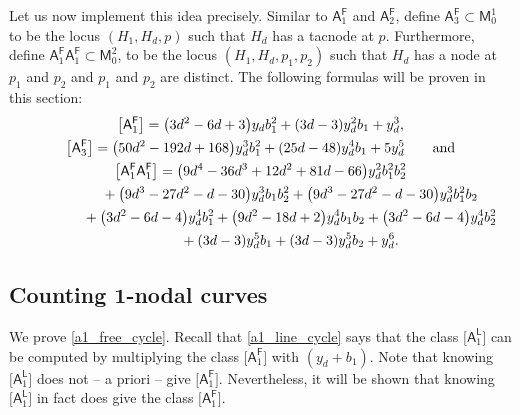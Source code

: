 \documentclass[pdftex]{sigma}
\numberwithin{equation}{section}
\begin{document}
Let us now implement this idea precisely.
Similar to $\mathsf{A}_1^{\mathsf{F}}$ and $\mathsf{A}_2^{\mathsf{F}}$, define
$\mathsf{A}_3^{\mathsf{F}} \subset \mathsf{M}^1_0$ to be the locus $(H_1, H_d, p)$
such that $H_d$ has a tacnode at $p$.
Furthermore, define $\mathsf{A}_1^{\mathsf{F}} \mathsf{A}_1^{\mathsf{F}} \subset \mathsf{M}^2_0$, to be
the locus $(H_1, H_d, p_1, p_2)$
such that $H_d$ has a node at $p_1$ and $p_2$ and $p_1$ and $p_2$ are distinct.
The following formulas will be proven in this section:
\begin{gather}
\bigl[\mathsf{A}_1^{\mathsf{F}}\bigr]  = \bigl(3d^2-6d+3\bigr) y_d b_1^2 + (3d-3)y_d^2 b_1 + y_d^3, \label{a1_free_cycle} \\
\bigl[\mathsf{A}_3^{\mathsf{F}}\bigr]  = \bigl(50d^2-192d+168\bigr) y_d^3 b_1^2 + (25d-48)y_d^4 b_1 + 5 y_d^5 \qquad \textnormal{and}
\label{A3F_cycle}\\
\bigl[\mathsf{A}_1^{\mathsf{F}} \mathsf{A}_1^{\mathsf{F}}\bigr]  = \bigl(9d^4-36d^3+12d^2+81d-66\bigr)y_d^2 b_1^2 b_2^2 \nonumber \\
\phantom{\bigl[\mathsf{A}_1^{\mathsf{F}} \mathsf{A}_1^{\mathsf{F}}\bigr]  = }{} + \bigl(9d^3-27d^2-d-30\bigr)y_d^3 b_1 b_2^2
+ \bigl(9d^3-27d^2-d-30\bigr) y_d^3 b_1^2 b_2 \nonumber \\
\phantom{\bigl[\mathsf{A}_1^{\mathsf{F}} \mathsf{A}_1^{\mathsf{F}}\bigr]  = }{} + \bigl(3d^2-6d-4\bigr)y_d^4 b_1^2 + \bigl(9d^2-18d+2\bigr)y_d^4 b_1 b_2 +
\bigl(3d^2-6d-4\bigr)y_d^4 b_2^2 \nonumber \\
\phantom{\bigl[\mathsf{A}_1^{\mathsf{F}} \mathsf{A}_1^{\mathsf{F}}\bigr]  = }{} + (3d-3)y_d^5 b_1 + (3d-3)y_d^5 b_2 + y_d^6. \label{a1fa1f_ag87}
\end{gather}

\subsection[Counting 1-nodal curves]{Counting $\boldsymbol{ 1}$-nodal curves}\label{node_new}

We prove \eqref{a1_free_cycle}. Recall that \eqref{a1_line_cycle}
says that the class $\bigl[\mathsf{A}_1^{\mathsf{L}}\bigr]$ can be computed by multiplying
the class $\bigl[\mathsf{A}_1^{\mathsf{F}}\bigr]$ with $(y_d + b_1)$. Note that
knowing $\bigl[\mathsf{A}_1^{\mathsf{L}}\bigr]$ does not -- a priori -- give
$\bigl[\mathsf{A}_1^{\mathsf{F}}\bigr]$. Nevertheless, it will be shown that knowing
$\bigl[\mathsf{A}_1^{\mathsf{L}}\bigr]$ in fact does give the class $\bigl[\mathsf{A}_1^{\mathsf{F}}\bigr]$.
\end{document}
